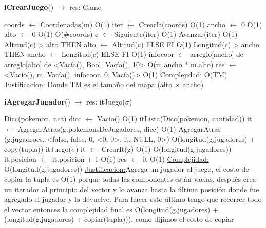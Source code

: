 \begin{Algoritmos}



\begin{algorithm}[H]{\textbf{iCrearJuego}() $\to$ res: Game}
	\begin{algorithmic}[1]
		\State coords $\gets$ Coordenadas(m) \Comment O(1)
		\State iter $\gets$ CrearIt(coords) \Comment O(1)
		\State ancho $\gets$ 0 \Comment O(1)
		\State alto $\gets$ 0 \Comment O(1)
		 \Comment O($\#$coords)
			\State c $\gets$ Siguiente(iter) \Comment O(1)
			\State Avanzar(iter) \Comment O(1)
			\State \IF Altitud(c) > alto THEN alto $\gets$ Altitud(c) ELSE FI \Comment O(1)
			\State \IF Longitud(c) > ancho THEN ancho $\gets$ Longitud(c) ELSE FI \Comment O(1)
		\EndWhile
		\State infocoor $\gets$ arreglo[ancho] de arreglo[alto] de <Vac\'ia(), Bool, Vac\'ia(), 10> \Comment O(m.ancho * m.alto)
		\State res $\gets$ <Vacio(), m, Vac\'ia(), infocoor, 0, Vac\'ia()> \Comment O(1)
		\medskip
		\Statex \underline{Complejidad:} O(TM)
		\Statex \underline{Justificacion:} Donde TM es el tama\~no del mapa (alto $\times$ ancho)
	\end{algorithmic}
\end{algorithm}


\begin{algorithm}[H]{\textbf{iAgregarJugador}() $\to$ res: itJuego($\sigma$)}
	\begin{algorithmic}[1]
		\State Dicc(pokemon, nat) dicc $\gets$ Vacio() \Comment O(1)
		\State itLista(Dicc(pokemon, cantidad)) it $\gets$ AgregarAtras(g.pokemonsDeJugadores, dicc) \Comment O(1) 
		\State AgregarAtras (g.jugadroes, <false, false, 0, <0, 0>, it, NULL, 0>) \Comment O(longitud(g.jugadores) + copy(tupla))
		\State   itJuego($\sigma$) it $\gets$ CrearIt(g) \Comment O(1)
		 \Comment O(longitud(g.jugadores))
			\State it.posicion $\gets$ it.posicion + 1 \Comment O(1)
		\EndWhile
		\State res $\gets$ it \Comment O(1)
		\medskip
		\Statex \underline{Complejidad:} O(longitud(g.jugadores))
		\Statex \underline{Justificacion:}Agrega un jugador al juego, el costo de copiar la tupla es O(1) porque todas las componentes están vacías, después crea un iterador al principio del vector y lo avanza hasta la última posición donde fue agregado el jugador y lo devuelve. Para hacer esto último tengo que recorrer todo el vector entonces la complejidad final es O(longitud(g.jugadores) + (longitud(g.jugadores) + copiar(tupla))), como dijimos el costo de copiar  
	\end{algorithmic}
\end{algorithm}


\end{Algoritmos}
